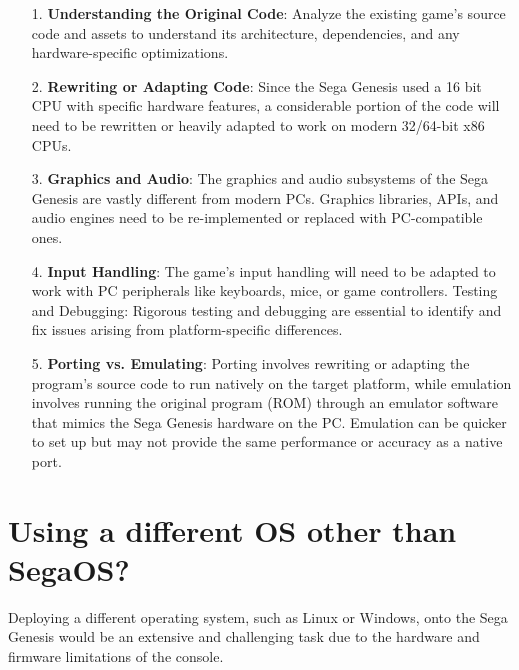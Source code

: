 \documentclass[12pt]{article}
\begin{document}
\begin{itemize}

\item[1.] \textbf{Understanding the Original Code}: Analyze the existing game's source code and assets to understand its architecture, dependencies, and any hardware-specific optimizations.

\item[2.] \textbf{Rewriting or Adapting Code}: Since the Sega Genesis used a 16 bit CPU with specific hardware features, a considerable portion of the code will need to be rewritten or heavily adapted to work on modern 32/64-bit x86 CPUs.

\item[3.] \textbf{Graphics and Audio}: The graphics and audio subsystems of the Sega Genesis are vastly different from modern PCs. Graphics libraries, APIs, and audio engines need to be re-implemented or replaced with PC-compatible ones.

\item[4.] \textbf{Input Handling}: The game's input handling will need to be adapted to work with PC peripherals like keyboards, mice, or game controllers.
Testing and Debugging: Rigorous testing and debugging are essential to identify and fix issues arising from platform-specific differences.

\item[5.] \textbf{Porting vs. Emulating}:
Porting involves rewriting or adapting the program's source code to run natively on the target platform, while emulation involves running the original program (ROM) through an emulator software that mimics the Sega Genesis hardware on the PC. Emulation can be quicker to set up but may not provide the same performance or accuracy as a native port.

\end{itemize}

\section{Using a different OS other than SegaOS?}

Deploying a different operating system, such as Linux or Windows, onto the Sega Genesis would be an extensive and challenging task due to the hardware and firmware limitations of the console.
\end{document}
